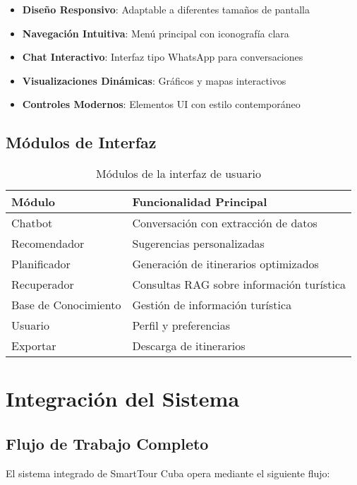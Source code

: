 \documentclass[runningheads]{llncs}
\begin{document}
\begin{itemize}
\item \textbf{Diseño Responsivo}: Adaptable a diferentes tamaños de pantalla
\item \textbf{Navegación Intuitiva}: Menú principal con iconografía clara
\item \textbf{Chat Interactivo}: Interfaz tipo WhatsApp para conversaciones
\item \textbf{Visualizaciones Dinámicas}: Gráficos y mapas interactivos
\item \textbf{Controles Modernos}: Elementos UI con estilo contemporáneo
\end{itemize}

\subsection{Módulos de Interfaz}

\begin{table}[H]
\centering
\begin{tabular}{ll}
\toprule
\textbf{Módulo} & \textbf{Funcionalidad Principal} \\
\midrule
Chatbot & Conversación con extracción de datos \\
Recomendador & Sugerencias personalizadas \\
Planificador & Generación de itinerarios optimizados \\
Recuperador & Consultas RAG sobre información turística \\
Base de Conocimiento & Gestión de información turística \\
Usuario & Perfil y preferencias \\
Exportar & Descarga de itinerarios \\
\bottomrule
\end{tabular}
\caption{Módulos de la interfaz de usuario}
\end{table}

\section{Integración del Sistema}

\subsection{Flujo de Trabajo Completo}

El sistema integrado de SmartTour Cuba opera mediante el siguiente flujo:
\end{document}
